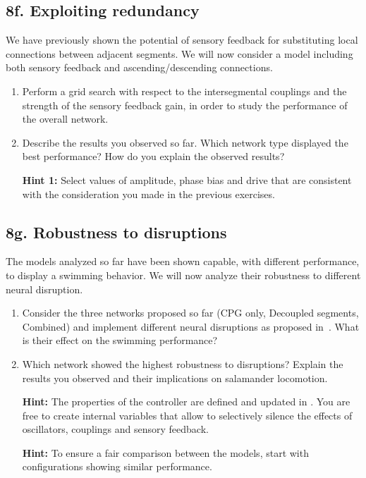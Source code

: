 \documentclass{cmc}
\begin{document}

\subsection*{8f. Exploiting redundancy}
\label{sec:exploiting-redundancy}

We have previously shown the potential of sensory feedback for
substituting local connections between adjacent segments. We will now
consider a model including both sensory feedback and ascending/descending
connections.

\begin{enumerate}

\item Perform a grid search with respect to the intersegmental couplings and
the strength of the sensory feedback gain, in order to study the performance
of the overall network.

\item Describe the results you observed so far. Which network type displayed
the best performance? How do you explain the observed results?

\textbf{Hint 1:} Select values of amplitude, phase bias and drive that are
  consistent with the consideration you made in the previous exercises.

\end{enumerate}



\subsection*{8g. Robustness to disruptions}
\label{sec:disruptions-robustness}

The models analyzed so far have been shown capable, with different performance,
to display a swimming behavior. We will now analyze their robustness to
different neural disruption.

\begin{enumerate}

  \item Consider the three networks proposed so far (CPG only,
  Decoupled segments, Combined) and implement different neural disruptions
  as proposed in~\cite{thandiackal2021emergence}. What is their effect on
  the swimming performance?

  \item Which network showed the highest robustness to disruptions?
  Explain the results you observed and their implications
  on salamander locomotion.

  \textbf{Hint:} The properties of the controller are defined and updated in
    . You are free to create internal variables
    that allow to selectively silence the effects of oscillators, couplings
    and sensory feedback.

  \textbf{Hint:} To ensure a fair comparison between the models, start with
  configurations showing similar performance.

  \end{enumerate}
\end{document}
